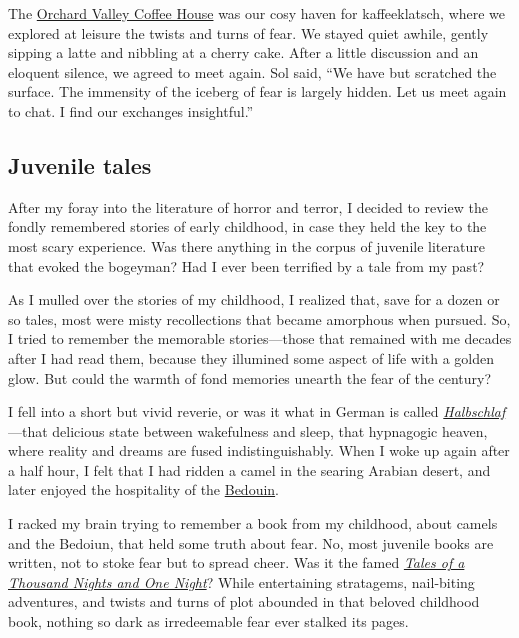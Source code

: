 \documentclass[
  a4paper,
]{article}
\begin{document}
The \href{http://www.orchardvalleycoffee.net/}{Orchard Valley Coffee
House} was our cosy haven for kaffeeklatsch, where we explored at
leisure the twists and turns of fear. We stayed quiet awhile, gently
sipping a latte and nibbling at a cherry cake. After a little discussion
and an eloquent silence, we agreed to meet again. Sol said, ``We have
but scratched the surface. The immensity of the iceberg of fear is
largely hidden. Let us meet again to chat. I find our exchanges
insightful.''

\subsection{Juvenile tales}\label{juvenile-tales}

After my foray into the literature of horror and terror, I decided to
review the fondly remembered stories of early childhood, in case they
held the key to the most scary experience. Was there anything in the
corpus of juvenile literature that evoked the bogeyman? Had I ever been
terrified by a tale from my past?

As I mulled over the stories of my childhood, I realized that, save for
a dozen or so tales, most were misty recollections that became amorphous
when pursued. So, I tried to remember the memorable stories---those that
remained with me decades after I had read them, because they illumined
some aspect of life with a golden glow. But could the warmth of fond
memories unearth the fear of the century?

I fell into a short but vivid reverie, or was it what in German is
called
\href{https://de.pons.com/\%C3\%BCbersetzung/deutsch-englisch/Halbschlaf}{\emph{Halbschlaf}}---that
delicious state between wakefulness and sleep, that hypnagogic heaven,
where reality and dreams are fused indistinguishably. When I woke up
again after a half hour, I felt that I had ridden a camel in the searing
Arabian desert, and later enjoyed the hospitality of the
\href{https://www.newworldencyclopedia.org/entry/Bedouin}{Bedouin}.

I racked my brain trying to remember a book from my childhood, about
camels and the Bedoiun, that held some truth about fear. No, most
juvenile books are written, not to stoke fear but to spread cheer. Was
it the famed
\href{https://www.newworldencyclopedia.org/entry/The_Book_of_One_Thousand_and_One_Nights}{\emph{Tales
of a Thousand Nights and One Night}}? While entertaining stratagems,
nail-biting adventures, and twists and turns of plot abounded in that
beloved childhood book, nothing so dark as irredeemable fear ever
stalked its pages.
\end{document}
